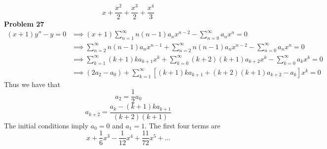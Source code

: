 \[
    x + \frac{x^2}{2} + \frac{x^3}{2} + \frac{x^4}{3}
\]
\textbf{Problem 27}
\begin{align*}
    (x+1)y'' - y = 0
    &\implies (x+1) \sum_{n=1}^\infty n(n-1)a_n x^{n-2}
        - \sum_{n=0}^\infty a_n x^n = 0 \\
    &\implies \sum_{n=2}^\infty n(n-1)a_n x^{n-1}
        + \sum_{n=2}^\infty n(n-1)a_n x^{n-2}
        - \sum_{n=0}^\infty a_n x^n = 0 \\
    &\implies \sum_{k=1}^\infty (k+1)ka_{k+1} x^k
        + \sum_{k=0}^\infty (k+2)(k+1)a_{k+2} x^k
        - \sum_{k=0}^\infty a_k x^k = 0 \\
    &\implies (2a_2-a_0) 
        + \sum_{k=1}^\infty [(k+1)ka_{k+1} + (k+2)(k+1)a_{k+2} - a_k] x^k = 0
\end{align*}
Thus we have that 
\[
    a_2 = \frac{1}{2}a_0
\]
\[
    a_{k+2} = \frac{a_k - (k+1)ka_{k+1}}{(k+2)(k+1)} 
\]
The initial conditions imply $a_0 = 0$ and $a_1 = 1$.
The first four terms are 
\[
    x + \frac{1}{6}x^3 - \frac{1}{12}x^4 + \frac{11}{72}x^5 + \hdots 
\]